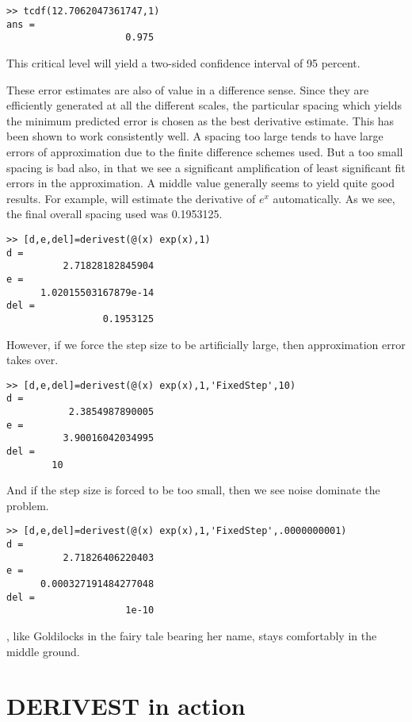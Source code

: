 \documentclass[a4paper,11pt]{article}
\begin{document}
\begin{lstlisting}
>> tcdf(12.7062047361747,1)
ans =
                     0.975
\end{lstlisting}

This critical level will yield a two-sided confidence interval of 95 percent.

These error estimates are also of value in a difference sense. Since they are efficiently generated
at all the different scales, the particular spacing which yields the minimum predicted error is chosen
as the best derivative estimate. This has been shown to work consistently well. A spacing too large
tends to have large errors of approximation due to the finite difference schemes used. But a too
small spacing is bad also, in that we see a significant amplification of least significant fit errors
in the approximation. A middle value generally seems to yield quite good results. For example,
 will estimate the derivative of $e^x$ automatically. As we see, the final overall
spacing used was 0.1953125.

\begin{lstlisting}
>> [d,e,del]=derivest(@(x) exp(x),1)
d =
          2.71828182845904
e =
      1.02015503167879e-14
del =
                 0.1953125
\end{lstlisting}

However, if we force the step size to be artificially large, then approximation error takes over.

\begin{lstlisting}
>> [d,e,del]=derivest(@(x) exp(x),1,'FixedStep',10)
d =
           2.3854987890005
e =
          3.90016042034995
del =
        10
\end{lstlisting}

And if the step size is forced to be too small, then we see noise dominate the problem.

\begin{lstlisting}
>> [d,e,del]=derivest(@(x) exp(x),1,'FixedStep',.0000000001)
d =
          2.71826406220403
e =
      0.000327191484277048
del =
                     1e-10
\end{lstlisting}

, like Goldilocks in the fairy tale bearing her name, stays comfortably in
the middle ground.


\bigskip

\section{DERIVEST in action}
\end{document}
